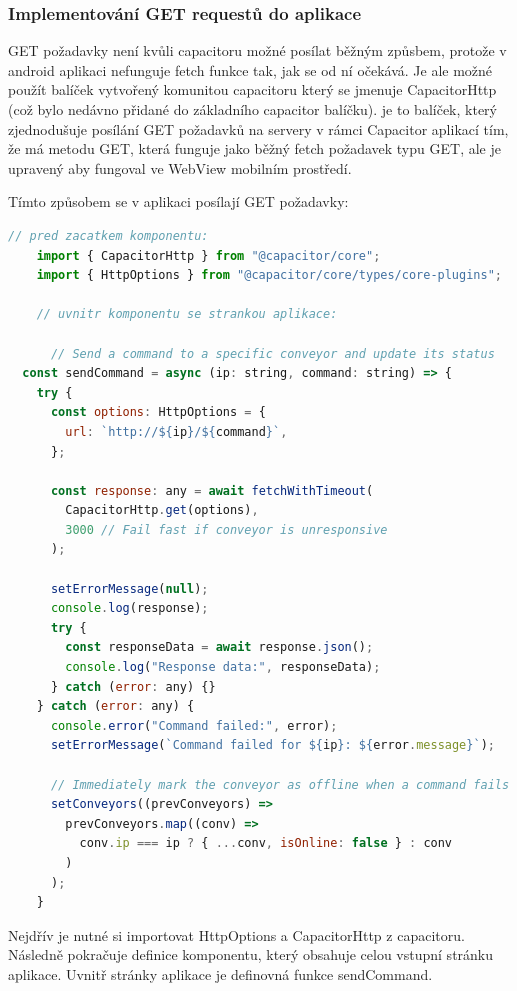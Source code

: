 \subsubsection{Implementování GET requestů do aplikace}

GET požadavky není kvůli capacitoru možné posílat běžným způsbem, protože v android aplikaci nefunguje fetch funkce tak, jak se od ní očekává. Je ale možné použít balíček vytvořený komunitou capacitoru který se jmenuje CapacitorHttp (což bylo nedávno přidané do základního capacitor balíčku). je to balíček, který zjednodušuje posílání GET požadavků na servery v rámci Capacitor aplikací tím, že má metodu GET, která funguje jako běžný fetch požadavek typu GET, ale je upravený aby fungoval ve WebView mobilním prostředí.

Tímto způsobem se v aplikaci posílají GET požadavky:
\begin{lstlisting}[language=JavaScript, caption={Funkce sendCommand dostupná uvnitř vstupní stránky aplikace}, label={lst:SendCommandFunkce}]   
    // pred zacatkem komponentu:
    import { CapacitorHttp } from "@capacitor/core";
    import { HttpOptions } from "@capacitor/core/types/core-plugins";

    // uvnitr komponentu se strankou aplikace:
      
      // Send a command to a specific conveyor and update its status
  const sendCommand = async (ip: string, command: string) => {
    try {
      const options: HttpOptions = {
        url: `http://${ip}/${command}`,
      };

      const response: any = await fetchWithTimeout(
        CapacitorHttp.get(options),
        3000 // Fail fast if conveyor is unresponsive
      );

      setErrorMessage(null);
      console.log(response);
      try {
        const responseData = await response.json();
        console.log("Response data:", responseData);
      } catch (error: any) {}
    } catch (error: any) {
      console.error("Command failed:", error);
      setErrorMessage(`Command failed for ${ip}: ${error.message}`);

      // Immediately mark the conveyor as offline when a command fails
      setConveyors((prevConveyors) =>
        prevConveyors.map((conv) =>
          conv.ip === ip ? { ...conv, isOnline: false } : conv
        )
      );
    }
\end{lstlisting}
Nejdřív je nutné si importovat HttpOptions a CapacitorHttp z capacitoru. Následně pokračuje definice komponentu, který obsahuje celou vstupní stránku aplikace. Uvnitř stránky aplikace je definovná funkce sendCommand.

